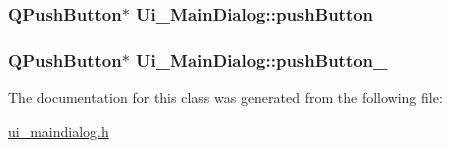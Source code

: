 \hypertarget{class_ui___main_dialog_ae43161e4541a8f071818ed7078f37d17}{
\subsubsection[{push\-Button}]{\setlength{\rightskip}{0pt plus 5cm}Q\-Push\-Button$\ast$ Ui\-\_\-\-Main\-Dialog\-::push\-Button}}\label{class_ui___main_dialog_ae43161e4541a8f071818ed7078f37d17}
\hypertarget{class_ui___main_dialog_a1e36704d648c5eff2f39361358473177}{
\subsubsection[{push\-Button\-\_\-2}]{\setlength{\rightskip}{0pt plus 5cm}Q\-Push\-Button$\ast$ Ui\-\_\-\-Main\-Dialog\-::push\-Button\-\_}}\label{class_ui___main_dialog_a1e36704d648c5eff2f39361358473177}


The documentation for this class was generated from the following file\-:\begin{DoxyCompactItemize}
\item 
\hyperlink{ui__maindialog_8h}{ui\-\_\-maindialog.\-h}\end{DoxyCompactItemize}
